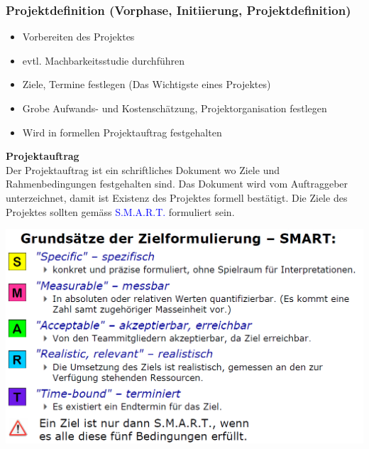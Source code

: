 \subsubsection{Projektdefinition (Vorphase, Initiierung, Projektdefinition)}
\begin{itemize}
	\item Vorbereiten des Projektes
	\item evtl. Machbarkeitsstudie durchführen
	\item Ziele, Termine festlegen (Das Wichtigste eines Projektes)
	\item Grobe Aufwands- und Kostenschätzung, Projektorganisation festlegen
	\item Wird in formellen Projektauftrag festgehalten
\end{itemize}
	\begin{minipage}{9cm}
		\textbf{Projektauftrag} \\
		Der Projektauftrag ist ein schriftliches Dokument wo Ziele und Rahmenbedingungen festgehalten sind. Das Dokument wird vom Auftraggeber unterzeichnet, damit ist Existenz des Projektes formell bestätigt. \newline Die Ziele des Projektes sollten gemäss \textcolor{blue}{S.M.A.R.T.} formuliert sein. 
	\end{minipage}
    \hfill
	\begin{minipage}{8.5cm}
		\includegraphics[width=\linewidth]{images/pmstart.png}
	\end{minipage}
\vspace{-0.5cm}	
